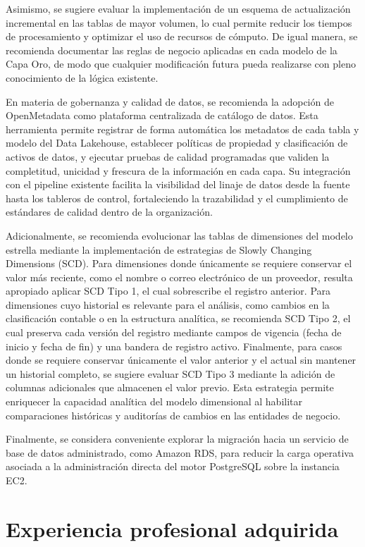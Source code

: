 Asimismo, se sugiere evaluar la implementación de un esquema de actualización incremental en las tablas de mayor volumen, lo cual permite reducir los tiempos de procesamiento y optimizar el uso de recursos de cómputo. De igual manera, se recomienda documentar las reglas de negocio aplicadas en cada modelo de la Capa Oro, de modo que cualquier modificación futura pueda realizarse con pleno conocimiento de la lógica existente.

En materia de gobernanza y calidad de datos, se recomienda la adopción de OpenMetadata como plataforma centralizada de catálogo de datos. Esta herramienta permite registrar de forma automática los metadatos de cada tabla y modelo del Data Lakehouse, establecer políticas de propiedad y clasificación de activos de datos, y ejecutar pruebas de calidad programadas que validen la completitud, unicidad y frescura de la información en cada capa. Su integración con el pipeline existente facilita la visibilidad del linaje de datos desde la fuente hasta los tableros de control, fortaleciendo la trazabilidad y el cumplimiento de estándares de calidad dentro de la organización.

Adicionalmente, se recomienda evolucionar las tablas de dimensiones del modelo estrella mediante la implementación de estrategias de Slowly Changing Dimensions (SCD). Para dimensiones donde únicamente se requiere conservar el valor más reciente, como el nombre o correo electrónico de un proveedor, resulta apropiado aplicar SCD Tipo 1, el cual sobrescribe el registro anterior. Para dimensiones cuyo historial es relevante para el análisis, como cambios en la clasificación contable o en la estructura analítica, se recomienda SCD Tipo 2, el cual preserva cada versión del registro mediante campos de vigencia (fecha de inicio y fecha de fin) y una bandera de registro activo. Finalmente, para casos donde se requiere conservar únicamente el valor anterior y el actual sin mantener un historial completo, se sugiere evaluar SCD Tipo 3 mediante la adición de columnas adicionales que almacenen el valor previo. Esta estrategia permite enriquecer la capacidad analítica del modelo dimensional al habilitar comparaciones históricas y auditorías de cambios en las entidades de negocio.

Finalmente, se considera conveniente explorar la migración hacia un servicio de base de datos administrado, como Amazon RDS, para reducir la carga operativa asociada a la administración directa del motor PostgreSQL sobre la instancia EC2.

\section{Experiencia profesional adquirida}

